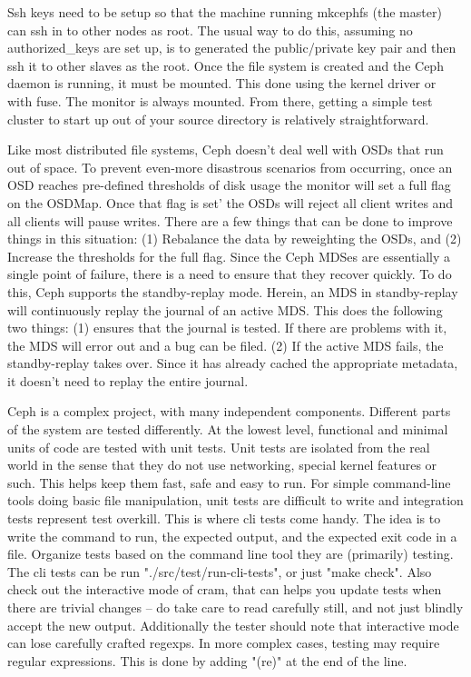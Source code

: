 \documentclass[11pt]{article}
\begin{document}
Ssh keys need to be setup so that the machine running mkcephfs (the master) 
can ssh in to other nodes as root. The usual way to do this, assuming no 
authorized\_keys are set up, is to generated the public/private key pair and 
then ssh it to other slaves as the root. Once the file system is created and 
the Ceph daemon is running, it must be mounted. This done using the kernel 
driver or with fuse. The monitor is always mounted. From there, getting a 
simple test cluster to start up out of your source directory is relatively 
straightforward.

Like most distributed file systems, Ceph doesn't deal well with OSDs that 
run out of space. To prevent even-more disastrous scenarios from occurring, 
once an OSD reaches pre-defined thresholds of disk usage the monitor will 
set a full flag on the OSDMap. Once that flag is set’ the OSDs will reject  
all client writes and all clients will pause writes. There are a few things 
that can be done to improve things in this situation: (1) Rebalance the data 
by reweighting the OSDs, and (2) Increase the thresholds for the full flag.
Since the Ceph MDSes are essentially a single point of failure, there is a 
need to ensure that they recover quickly. To do this, Ceph supports the 
standby-replay mode. Herein, an MDS in standby-replay will continuously 
replay the journal of an active MDS. This does the following two things: 
(1) ensures that the journal is tested. If there are problems with it, the 
MDS will error out and a bug can be filed. (2) If the active MDS fails, the 
standby-replay takes over. Since it has already cached the appropriate 
metadata, it doesn't need to replay the entire journal.

Ceph is a complex project, with many independent components. Different parts 
of the system are tested differently. At the lowest level, functional and 
minimal units of code are tested with unit tests. Unit tests are isolated 
from the real world in the sense that they do not use networking, special 
kernel features or such. This helps keep them fast, safe and easy to run.  
For simple command-line tools doing basic file manipulation, unit tests are 
difficult to write and integration tests represent test overkill. This is 
where cli tests come handy. The idea is to write the command to run, the 
expected output, and the expected exit code in a file. Organize tests based 
on the command line tool they are (primarily) testing. The cli tests can be 
run "./src/test/run-cli-tests", or just "make check". Also check out the 
interactive mode of cram, that can helps you update tests when there are 
trivial changes -- do take care to read carefully still, and not just 
blindly accept the new output.  Additionally the tester should note that 
interactive mode can lose carefully crafted regexps. In more complex cases, 
testing may require regular expressions. This is done by adding "(re)" at 
the end of the line.
\end{document}
